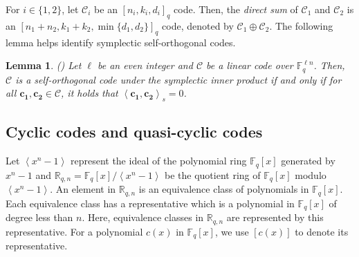 \documentclass[journal]{IEEEtran}
\newtheorem{lemma}{Lemma}
\begin{document}
For $i \in\{1, 2\}$, let $\mathscr{C}_i$ be an $\left[n_i , k_i , d_i \right]_q$ code. Then, the \textit{ direct sum}  of $\mathscr{C}_1$ and $\mathscr{C}_2$ is an $\left[n_1 + n_2, k_1 + k_2, \min\{d_1, d_2\}\right]_q$ code, denoted by $\mathscr{C}_1\oplus  \mathscr{C}_2$.
The following lemma helps identify symplectic self-orthogonal codes.

\begin{lemma}\label{lemma-self-orthogonal}(\cite{huffman2021concise})
	Let $\ell$ be an even integer and $\mathscr{C}$ be a linear code over $\mathbb{F}_q^{\ell n}$. Then, $\mathscr{C}$ is a self-orthogonal code under the symplectic inner product if and only if for all $\mathbf{c_1}, \mathbf{c_2} \in \mathscr{C}$, it holds that $\left\langle \mathbf{c_1}, \mathbf{c_2}\right\rangle_s = 0$.
\end{lemma}
 

\subsection{Cyclic codes and quasi-cyclic codes}

Let $\left\langle x^{n}-1\right\rangle$ represent the ideal of the polynomial ring $\mathbb{F}_q\left[x\right]$ generated by $x^n -1$ and $\mathbb{R}_{q,n} = \mathbb{F}_q\left[x\right]/\left\langle x^{n}-1\right\rangle$ be the quotient ring of $\mathbb{F}_q\left[x\right]$ modulo $\left\langle x^{n}-1\right\rangle$.
An element in  $\mathbb{R}_{q,n}$ is an equivalence class of polynomials in $\mathbb{F}_q[x]$. Each equivalence class has a representative which is a polynomial in $\mathbb{F}_q[x]$ of degree less than $n$. Here, equivalence classes in $\mathbb{R}_{q,n}$ are represented by this representative. For a polynomial $c(x)$ in $\mathbb{F}_q[x]$, we use $[c(x)]$ to denote its representative.
\end{document}
